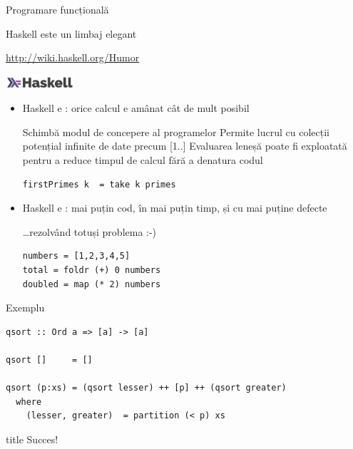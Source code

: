 \documentclass[xcolor=pdftex,romanian,colorlinks]{beamer}
\begin{document}
\begin{section}{Programare funcțională}
\begin{frame}{Haskell este un limbaj elegant}
\begin{itemize}
\begin{itemize}
\url{http://wiki.haskell.org/Humor}
\end{itemize}
\end{itemize}
\end{frame}



\begin{frame}[fragile]{\includegraphics[height=0.5cm]{lambda.png} }
\begin{itemize}
\item Haskell e : orice calcul e amânat cât de mult posibil
\begin{itemize}
\vitem Schimbă modul de concepere al programelor
\vitem Permite lucrul cu colecții potențial infinite de date precum [1..]
\vitem Evaluarea leneșă poate fi exploatată pentru a reduce timpul de calcul fără a denatura codul
\begin{lstlisting}
firstPrimes k  = take k primes
\end{lstlisting}
\end{itemize}

\item Haskell e : mai puțin cod, în mai puțin timp, și cu mai puține defecte
\begin{itemize}
\vitem
\dots rezolvând totuși problema :-)
\small{
\begin{lstlisting}
numbers = [1,2,3,4,5]
total = foldr (+) 0 numbers
doubled = map (* 2) numbers
\end{lstlisting}}
\end{itemize}
\end{itemize}
\end{frame}




\begin{frame}[fragile]{  Exemplu}
\begin{lstlisting}
qsort :: Ord a => [a] -> [a]

qsort []     = []

qsort (p:xs) = (qsort lesser) ++ [p] ++ (qsort greater)
  where
    (lesser, greater)  = partition (< p) xs
\end{lstlisting}

\end{frame}

\end{section}

\begin{frame}
  \vfill
  \centering



  \begin{beamercolorbox}[sep=8pt,center,shadow=true,rounded=true]{title}
     Succes! \par%
  \end{beamercolorbox}
  \vfill
  \end{frame}
\end{document}
